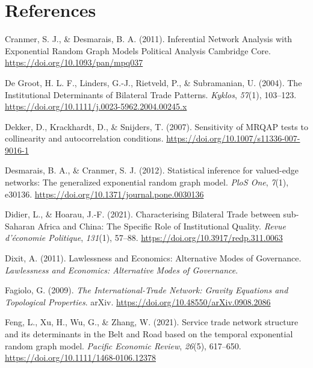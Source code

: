 \documentclass[
]{article}
\newlength{\cslhangindent}
\newenvironment{CSLReferences}[2] %
 {\begin{list}{}{%
  \setlength{\itemindent}{0pt}
  \setlength{\leftmargin}{0pt}
  \setlength{\parsep}{0pt}
  \ifodd #1
   \setlength{\leftmargin}{\cslhangindent}
   \setlength{\itemindent}{-1\cslhangindent}
  \fi
  \setlength{\itemsep}{#2\baselineskip}}}
 {\end{list}}
\begin{document}
\newpage{}

\section{References}\label{references}

\label{refs}
\begin{CSLReferences}{1}{0}
Cranmer, S. J., \& Desmarais, B. A. (2011). Inferential {Network}
{Analysis} with {Exponential} {Random} {Graph} {Models} {\textbar}
{Political} {Analysis} {\textbar} {Cambridge} {Core}.
\url{https://doi.org/10.1093/pan/mpq037}

De Groot, H. L. F., Linders, G.-J., Rietveld, P., \& Subramanian, U.
(2004). The {Institutional} {Determinants} of {Bilateral} {Trade}
{Patterns}. \emph{Kyklos}, \emph{57}(1), 103--123.
\url{https://doi.org/10.1111/j.0023-5962.2004.00245.x}

Dekker, D., Krackhardt, D., \& Snijders, T. (2007). Sensitivity of MRQAP
tests to collinearity and autocorrelation conditions.
\url{https://doi.org/10.1007/s11336-007-9016-1}

Desmarais, B. A., \& Cranmer, S. J. (2012). Statistical inference for
valued-edge networks: The generalized exponential random graph model.
\emph{PloS One}, \emph{7}(1), e30136.
\url{https://doi.org/10.1371/journal.pone.0030136}

Didier, L., \& Hoarau, J.-F. (2021). Characterising {Bilateral} {Trade}
between sub-{Saharan} {Africa} and {China}: {The} {Specific} {Role} of
{Institutional} {Quality}. \emph{Revue d'économie Politique},
\emph{131}(1), 57--88. \url{https://doi.org/10.3917/redp.311.0063}

Dixit, A. (2011). Lawlessness and {Economics}: {Alternative} {Modes} of
{Governance}. \emph{Lawlessness and Economics: Alternative Modes of
Governance}.

Fagiolo, G. (2009). \emph{The {International}-{Trade} {Network}:
{Gravity} {Equations} and {Topological} {Properties}}. arXiv.
\url{https://doi.org/10.48550/arXiv.0908.2086}

Feng, L., Xu, H., Wu, G., \& Zhang, W. (2021). Service trade network
structure and its determinants in the {Belt} and {Road} based on the
temporal exponential random graph model. \emph{Pacific Economic Review},
\emph{26}(5), 617--650. \url{https://doi.org/10.1111/1468-0106.12378}


\end{CSLReferences}
\end{document}
